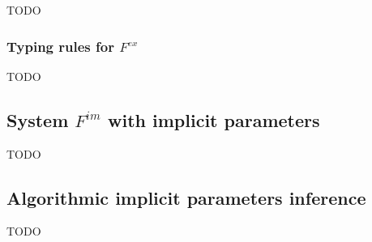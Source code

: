\documentclass[acmsmall]{acmart}
\begin{document}

TODO %

\subsubsection{Typing rules for $F^{ex}$}

TODO %

\subsection{System $F^{im}$ with implicit parameters}

TODO %

\subsection{Algorithmic implicit parameters inference} \label{subsec:inference}

TODO %









%
\end{document}
